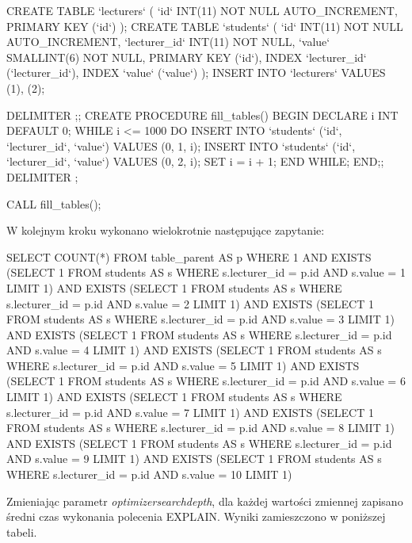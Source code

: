 \begin{spverbatim}
	CREATE TABLE `lecturers`
	(
	`id` INT(11) NOT NULL AUTO_INCREMENT,
	PRIMARY KEY (`id`)
	);
	CREATE TABLE `students`
	(
	`id` INT(11) NOT NULL AUTO_INCREMENT,
	`lecturer_id` INT(11) NOT NULL,
	`value` SMALLINT(6) NOT NULL,
	PRIMARY KEY (`id`),
	INDEX `lecturer_id` (`lecturer_id`),
	INDEX `value` (`value`)
	);
	INSERT INTO `lecturers` VALUES (1), (2);
	
	DELIMITER ;;
	CREATE PROCEDURE fill_tables()
	BEGIN
		DECLARE i INT DEFAULT 0;
		WHILE i <= 1000 DO
			INSERT INTO `students` (`id`, `lecturer_id`, `value`) VALUES (0, 1, i);
			INSERT INTO `students` (`id`, `lecturer_id`, `value`) VALUES (0, 2, i);
			SET i = i + 1;
		END WHILE;
	END;;
	DELIMITER ;
	
	CALL fill_tables();
\end{spverbatim}
\bigskip
W kolejnym kroku wykonano wielokrotnie następujące zapytanie:
\bigskip
\begin{spverbatim}
	SELECT COUNT(*) FROM table_parent AS p WHERE 1
	AND EXISTS (SELECT 1 FROM students AS s WHERE s.lecturer_id = p.id AND s.value = 1 LIMIT 1)
	AND EXISTS (SELECT 1 FROM students AS s WHERE s.lecturer_id = p.id AND s.value = 2 LIMIT 1)
	AND EXISTS (SELECT 1 FROM students AS s WHERE s.lecturer_id = p.id AND s.value = 3 LIMIT 1)
	AND EXISTS (SELECT 1 FROM students AS s WHERE s.lecturer_id = p.id AND s.value = 4 LIMIT 1)
	AND EXISTS (SELECT 1 FROM students AS s WHERE s.lecturer_id = p.id AND s.value = 5 LIMIT 1)
	AND EXISTS (SELECT 1 FROM students AS s WHERE s.lecturer_id = p.id AND s.value = 6 LIMIT 1)
	AND EXISTS (SELECT 1 FROM students AS s WHERE s.lecturer_id = p.id AND s.value = 7 LIMIT 1)
	AND EXISTS (SELECT 1 FROM students AS s WHERE s.lecturer_id = p.id AND s.value = 8 LIMIT 1)
	AND EXISTS (SELECT 1 FROM students AS s WHERE s.lecturer_id = p.id AND s.value = 9 LIMIT 1)
	AND EXISTS (SELECT 1 FROM students AS s WHERE s.lecturer_id = p.id AND s.value = 10 LIMIT 1)
\end{spverbatim}
Zmieniając parametr \textit{optimizer\textunderscore search\textunderscore depth}, dla każdej wartości zmiennej zapisano średni czas wykonania polecenia EXPLAIN. Wyniki zamieszczono w poniższej tabeli.

